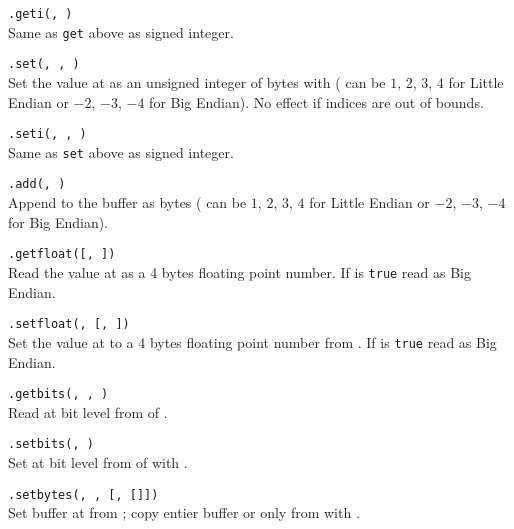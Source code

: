 \hangpar {}\texttt{.geti(}\texttt{, }\texttt{)} \\
Same as \texttt{get} above as signed integer.

\hangpar {}\texttt{.set(}\texttt{, }\texttt{, }\texttt{)} \\
Set the value at  as an unsigned integer of  bytes with  ( can be $1$, $2$, $3$, $4$ for Little Endian or $-2$, $-3$, $-4$ for Big Endian). No effect if indices are out of bounds.

\hangpar {}\texttt{.seti(}\texttt{, }\texttt{, }\texttt{)} \\
Same as \texttt{set} above as signed integer.

\hangpar {}\texttt{.add(}\texttt{, }\texttt{)} \\
Append  to the  buffer as  bytes ( can be $1$, $2$, $3$, $4$ for Little Endian or $-2$, $-3$, $-4$ for Big Endian).

\hangpar {}\texttt{.getfloat(}\texttt{[, }\texttt{])} \\
Read the value at  as a 4 bytes floating point number. If  is \texttt{true} read as Big Endian.

\hangpar {}\texttt{.setfloat(}\texttt{, }\texttt{[, }\texttt{])} \\
Set the value at  to a 4 bytes floating point number from . If  is \texttt{true} read as Big Endian.

\hangpar {}\texttt{.getbits(}\texttt{, }\texttt{, }\texttt{)} \\
Read at bit level from  of .

\hangpar {}\texttt{.setbits(}\texttt{, }\texttt{)} \\
Set at bit level from  of  with .

\hangpar {}\texttt{.setbytes(}\texttt{, }\texttt{, [}\texttt{, [}\texttt{]])}\\
Set buffer at  from ; copy entier buffer or only from  with .

